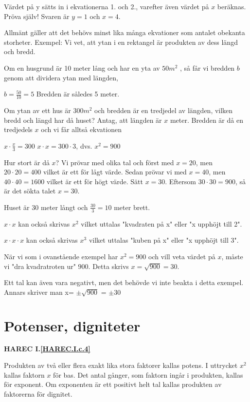 Värdet på y sätts in i ekvationerna 1. och 2., varefter även värdet på $x$
beräknas.
Pröva själv! Svaren är $y = 1$ och $x = 4$.

Allmänt gäller att det behövs minst lika många ekvationer som antalet obekanta
storheter.
Exempel:
Vi vet, att ytan i en rektangel är produkten av dess längd och bredd.

Om en husgrund är 10 meter lång och har en yta av $50 m^2$ , så får vi bredden
$b$ genom att dividera ytan med längden,

$b = \frac{50}{10} = 5$ Bredden är således 5 meter.

Om ytan av ett hus är $300 m^2$ och bredden är en tredjedel av längden, vilken
bredd och längd har då huset?
Antag, att längden är $x$ meter. Bredden är då en tredjedels $x$ och vi får
alltså ekvationen

$x \cdot \frac{x}{3} = 300$ $x \cdot x = 300 \cdot 3$, dvs. $x^2 = 900$

Hur stort är då $x$?
Vi prövar med olika tal och först med $x = 20$, men $20 \cdot 20 = 400$ vilket
är ett för lågt värde. Sedan prövar vi med $x = 40$, men $40 \cdot 40 = 1600$
vilket är ett för högt värde. Sätt $x = 30$. Eftersom $30 \cdot 30 = 900$, så är
det sökta talet $x = 30$.

Huset är 30 meter långt och $\frac{30}{3} = 10$ meter brett.

$x \cdot x$ kan också skrivas $x^2$ vilket uttalas "kvadraten på x" eller
"x upphöjt till 2".

$x \cdot x \cdot x$ kan också skrivas $x^3$ vilket uttalas "kuben på x" eller
"x upphöjt till 3".

När vi som i ovanstående exempel har $x^2 = 900$ och vill veta värdet på $x$,
måste vi "dra kvadratroten ur" $900$.
Detta skrivs $x = \sqrt{900} = 30$.

Ett tal kan även vara negativt, men det behövde vi inte beakta i detta exempel.
Annars skriver man x= $\pm \sqrt{900}$ = $\pm 30$

\section{Potenser, digniteter}
\textbf{HAREC I.\ref{HAREC.I.c.4}\label{myHAREC.I.c.4}}

Produkten av två eller flera exakt lika stora faktorer kallas potens. I
uttrycket $x^2$ kallas faktorn $x$ för bas. Det antal gånger, som faktorn ingår
i produkten, kallas för exponent. Om exponenten är ett positivt helt tal
kallas produkten av faktorerna för dignitet.

